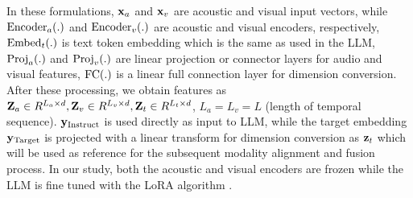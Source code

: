\documentclass[conference]{IEEEtran}
\begin{document}
In these formulations, ${{\bf x}_a}$ and ${{\bf x}_v}$ are acoustic and visual input vectors, while ${{\rm Encoder}_a}(.)$ and ${{\rm Encoder}_v}(.)$ are acoustic and visual encoders, respectively, ${\rm Embed}_t(.)$ is text token embedding which is the same as used in the LLM, ${\rm Proj}_a(.)$ and ${\rm Proj}_v(.)$ are linear projection or connector layers for audio and visual features, ${\rm FC(.)}$ is a linear full connection layer for dimension conversion. After these processing, we obtain features as ${\bf Z}_a  \in R^{L_a  \times d} ,{\bf Z}_v  \in R^{L_v  \times d} ,{\bf Z}_t  \in R^{L_t  \times d} $, $L_a  = L_v  = L$ (length of temporal sequence). ${\bf y}_{{\rm Instruct}}$ is used directly as input to LLM, while the target embedding ${\bf y}_{{\rm Target}}$ is projected with a linear transform for dimension conversion as ${\bf z}_t$ which will be used as reference for the subsequent modality alignment and fusion process. In our study, both the acoustic and visual encoders are frozen while the LLM is fine tuned with the LoRA algorithm \cite{LoRA}.
\end{document}
